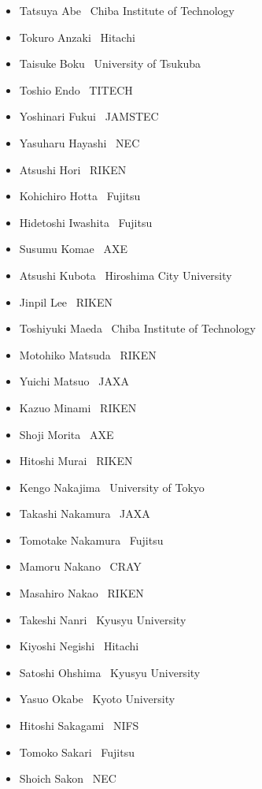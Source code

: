 \documentclass[a4paper,11pt,twoside]{report}
\begin{document}
\begin{itemize}
\setlength{\itemsep}{-1mm}
\item Tatsuya Abe        \dotfill \ Chiba Institute of Technology
\item Tokuro Anzaki      \dotfill \ Hitachi
\item Taisuke Boku       \dotfill \ University of Tsukuba
\item Toshio Endo        \dotfill \ TITECH
\item Yoshinari Fukui    \dotfill \ JAMSTEC
\item Yasuharu Hayashi   \dotfill \ NEC
\item Atsushi Hori       \dotfill \ RIKEN
\item Kohichiro Hotta    \dotfill \ Fujitsu
\item Hidetoshi Iwashita \dotfill \ Fujitsu
\item Susumu Komae       \dotfill \ AXE
\item Atsushi Kubota     \dotfill \ Hiroshima City University
\item Jinpil Lee         \dotfill \ RIKEN
\item Toshiyuki Maeda    \dotfill \ Chiba Institute of Technology
\item Motohiko Matsuda   \dotfill \ RIKEN
\item Yuichi Matsuo      \dotfill \ JAXA
\item Kazuo Minami       \dotfill \ RIKEN
\item Shoji Morita       \dotfill \ AXE
\item Hitoshi Murai      \dotfill \ RIKEN
\item Kengo Nakajima     \dotfill \ University of Tokyo
\item Takashi Nakamura   \dotfill \ JAXA
\item Tomotake Nakamura  \dotfill \ Fujitsu
\item Mamoru Nakano      \dotfill \ CRAY
\item Masahiro Nakao     \dotfill \ RIKEN
\item Takeshi Nanri      \dotfill \ Kyusyu University
\item Kiyoshi Negishi    \dotfill \ Hitachi
\item Satoshi Ohshima    \dotfill \ Kyusyu University
\item Yasuo Okabe        \dotfill \ Kyoto University
\item Hitoshi Sakagami   \dotfill \ NIFS
\item Tomoko Sakari      \dotfill \ Fujitsu
\item Shoich Sakon       \dotfill \ NEC

\end{itemize}
\end{document}
